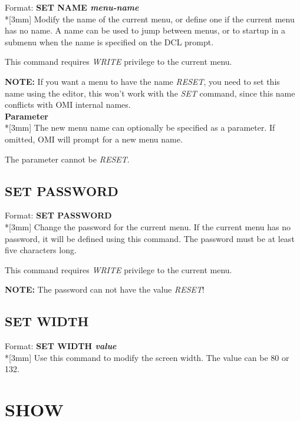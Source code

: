 \documentclass[a4paper]{book}
\newcommand{\vs}{\vspace{3mm}}
\renewcommand{\indent}{\hspace*{5mm}}
\begin{document}
\indent Format: \textbf{SET NAME \textit{menu-name}}\dag\\*[3mm]
Modify the name of the current menu, or define one if the current menu has 
no name. A name can be used to jump between menus, or to startup in a 
submenu when the name is specified on the DCL prompt.

This command requires \textsl{WRITE} privilege to the current menu.

\vs

\hspace{-8mm}\textbf{NOTE:} If you want a menu to have the name \textsl{RESET}, you need to set 
this name using the editor, this won't work with the \textsl{SET} command, since this 
name conflicts with OMI internal names.\\[3mm]
\textbf{Parameter}\\*[3mm]
The new menu name can optionally be specified as a parameter. If omitted, 
OMI will prompt for a new menu name.

The parameter cannot be \textsl{RESET}.

\subsection{SET PASSWORD}
\label{subsubsec:mylabel78}

\indent Format: \textbf{SET PASSWORD}\dag \\*[3mm]
Change the password for the current menu. If the current menu has no 
password, it will be defined using this command. The password must be at 
least five characters long.

This command requires \textsl{WRITE} privilege to the current menu.

\vs

\hspace{-8mm}\textbf{NOTE:} The password can not have the value \textsl{RESET}!

\subsection{SET WIDTH}
\label{subsubsec:mylabel79}

\indent Format: \textbf{SET WIDTH \textit{value}}\\*[3mm]
Use this command to modify the screen width. The value can be 80 or 132.

\section{SHOW}
\label{subsec:showthis}
\end{document}
